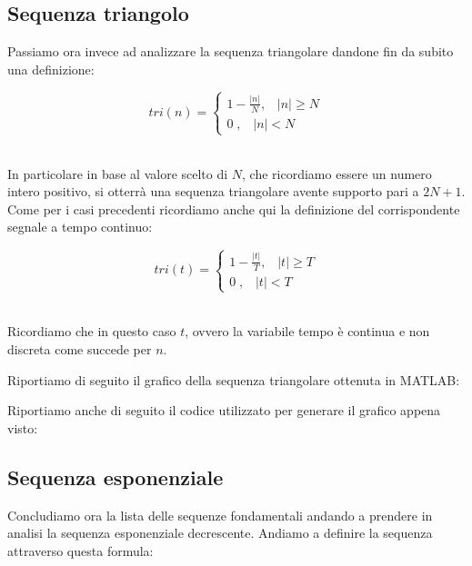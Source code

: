 \documentclass[../main.tex]{subfiles}
\begin{document}


\subsection{Sequenza triangolo}

Passiamo ora invece ad analizzare la sequenza triangolare dandone fin da subito una definizione:

\[ \unit{tri}(n) = \begin{cases}
	1 - \tfrac{|n|}{N}, \hspace{10pt} |n| \geq N \\
	0\;, \hspace{10pt} |n| < N
 \end{cases} \]\

In particolare in base al valore scelto di $N$, che ricordiamo essere un numero intero positivo, si otterrà una sequenza triangolare avente supporto pari a $2N+1$.
Come per i casi precedenti ricordiamo anche qui la definizione del corrispondente segnale a tempo continuo:

\[ \unit{tri}(t) = \begin{cases}
	1 - \tfrac{|t|}{T}, \hspace{10pt} |t| \geq T \\
	0\;, \hspace{10pt} |t| < T	
\end{cases} \]\

Ricordiamo che in questo caso $t$, ovvero la variabile tempo è continua e non discreta come succede per $n$.

Riportiamo di seguito il grafico della sequenza triangolare ottenuta in MATLAB:


Riportiamo anche di seguito il codice utilizzato per generare il grafico appena visto:



\subsection{Sequenza esponenziale}

Concludiamo ora la lista delle sequenze fondamentali andando a prendere in analisi la sequenza esponenziale decrescente.
Andiamo a definire la sequenza attraverso questa formula:
\end{document}
